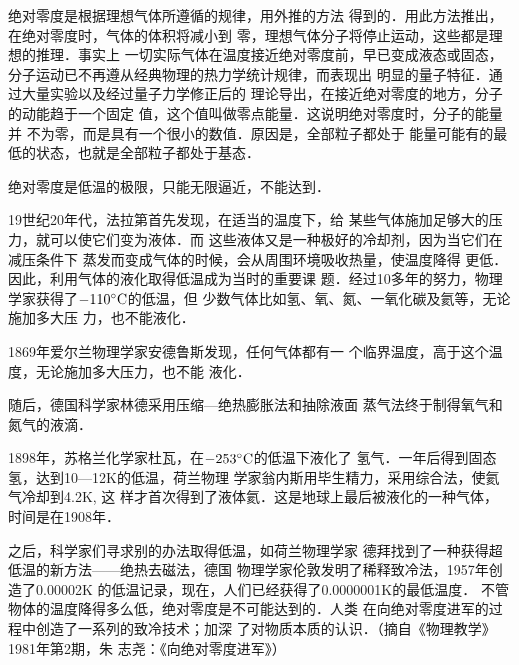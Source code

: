 绝对零度是根据理想气体所遵循的规律，用外推的方法
得到的．用此方法推出，在绝对零度时，气体的体积将减小到
零，理想气体分子将停止运动，这些都是理想的推理．事实上
一切实际气体在温度接近绝对零度前，早已变成液态或固态，
分子运动已不再遵从经典物理的热力学统计规律，而表现出
明显的量子特征．通过大量实验以及经过量子力学修正后的
理论导出，在接近绝对零度的地方，分子的动能趋于一个固定
值，这个值叫做零点能量．这说明绝对零度时，分子的能量并
不为零，而是具有一个很小的数值．原因是，全部粒子都处于
能量可能有的最低的状态，也就是全部粒子都处于基态．

绝对零度是低温的极限，只能无限逼近，不能达到．

19世纪20年代，法拉第首先发现，在适当的温度下，给
某些气体施加足够大的压力，就可以使它们变为液体．而
这些液体又是一种极好的冷却剂，因为当它们在减压条件下
蒸发而变成气体的时候，会从周围环境吸收热量，使温度降得
更低．因此，利用气体的液化取得低温成为当时的重要课
题．经过10多年的努力，物理学家获得了$-110^{\circ}{\rm C}$的低温，但
少数气体比如氢、氧、氮、一氧化碳及氦等，无论施加多大压
力，也不能液化．

1869年爱尔兰物理学家安德鲁斯发现，任何气体都有一
个临界温度，高于这个温度，无论施加多大压力，也不能
液化．

随后，德国科学家林德采用压缩—绝热膨胀法和抽除液面
蒸气法终于制得氧气和氮气的液滴．

1898年，苏格兰化学家杜瓦，在$-253^{\circ}{\rm C}$的低温下液化了
氢气．一年后得到固态氢，达到10—12K的低温，荷兰物理
学家翁内斯用毕生精力，采用综合法，使氦气冷却到4.2K, 这
样才首次得到了液体氦．这是地球上最后被液化的一种气体，
时间是在1908年．

之后，科学家们寻求别的办法取得低温，如荷兰物理学家
德拜找到了一种获得超低温的新方法——绝热去磁法，德国
物理学家伦敦发明了稀释致冷法，1957年创造了0.00002K
的低温记录，现在，人们已经获得了0.0000001K的最低温度．
不管物体的温度降得多么低，绝对零度是不可能达到的．人类
在向绝对零度进军的过程中创造了一系列的致冷技术；加深
了对物质本质的认识．（摘自《物理教学》1981年第2期，朱
志尧：《向绝对零度进军》）





